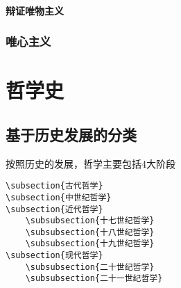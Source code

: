 \documentclass[UTF8]{../RepresentationUniverse}
\begin{document}
        \subsubsection{辩证唯物主义}
    \subsection{唯心主义}


    




\chapter{哲学史}





\section{基于历史发展的分类}
按照历史的发展，哲学主要包括4大阶段

\begin{lstlisting}
\subsection{古代哲学}
\subsection{中世纪哲学}
\subsection{近代哲学}
    \subsubsection{十七世纪哲学}
    \subsubsection{十八世纪哲学}
    \subsubsection{十九世纪哲学}
\subsection{现代哲学}
    \subsubsection{二十世纪哲学}
    \subsubsection{二十一世纪哲学}
\end{lstlisting}
\end{document}
